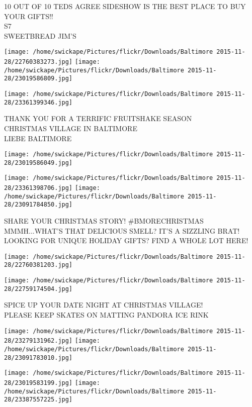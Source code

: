 \documentclass[10pt,letterpaper]{article}
\begin{document}
10 OUT OF 10 TEDS AGREE SIDESHOW IS THE BEST PLACE TO BUY YOUR GIFTS!!\\
S7\\
SWEETBREAD JIM'S
\pagebreak

\texttt{[image: /home/swickape/Pictures/flickr/Downloads/Baltimore 2015-11-28/22760383273.jpg]}
\texttt{[image: /home/swickape/Pictures/flickr/Downloads/Baltimore 2015-11-28/23019586809.jpg]}

\vspace{0.25in}
\texttt{[image: /home/swickape/Pictures/flickr/Downloads/Baltimore 2015-11-28/23361399346.jpg]}

THANK YOU FOR A TERRIFIC FRUITSHAKE SEASON\\
CHRISTMAS VILLAGE IN BALTIMORE\\
LIEBE BALTIMORE
\pagebreak

\texttt{[image: /home/swickape/Pictures/flickr/Downloads/Baltimore 2015-11-28/23019586049.jpg]}

\vspace{0.25in}
\texttt{[image: /home/swickape/Pictures/flickr/Downloads/Baltimore 2015-11-28/23361398706.jpg]}
\texttt{[image: /home/swickape/Pictures/flickr/Downloads/Baltimore 2015-11-28/23091784850.jpg]}

SHARE YOUR CHRISTMAS STORY!  \#BMORECHRISTMAS\\
MMMH...WHAT'S THAT DELICIOUS SMELL?  IT'S A SIZZLING BRAT!\\
LOOKING FOR UNIQUE HOLIDAY GIFTS?  FIND A WHOLE LOT HERE!
\pagebreak

\texttt{[image: /home/swickape/Pictures/flickr/Downloads/Baltimore 2015-11-28/22760381203.jpg]}

\vspace{0.25in}
\texttt{[image: /home/swickape/Pictures/flickr/Downloads/Baltimore 2015-11-28/22759174504.jpg]}

SPICE UP YOUR DATE NIGHT AT CHRISTMAS VILLAGE!\\
PLEASE KEEP SKATES ON MATTING PANDORA ICE RINK
\pagebreak

\texttt{[image: /home/swickape/Pictures/flickr/Downloads/Baltimore 2015-11-28/23279131962.jpg]}
\texttt{[image: /home/swickape/Pictures/flickr/Downloads/Baltimore 2015-11-28/23091783010.jpg]}

\texttt{[image: /home/swickape/Pictures/flickr/Downloads/Baltimore 2015-11-28/23019583199.jpg]}
\texttt{[image: /home/swickape/Pictures/flickr/Downloads/Baltimore 2015-11-28/23387557225.jpg]}
\end{document}
